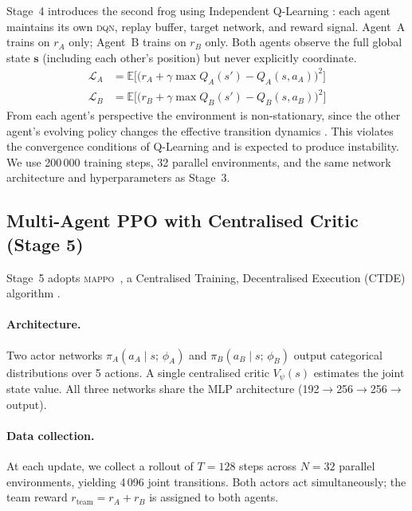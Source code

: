 \documentclass[12pt]{article}
\newcommand{\state}{s}
\newcommand{\action}{a}
\newcommand{\policy}{\pi}
\newcommand{\discount}{\gamma}
\newcommand{\MAPPO}{\textsc{mappo}}
\newcommand{\DQN}{\textsc{dqn}}
\begin{document}
Stage~4 introduces the second frog using Independent Q-Learning
\citep{tan1993multi}: each agent maintains its own \DQN, replay buffer,
target network, and reward signal.  Agent~A trains on $r_A$ only; Agent~B
trains on $r_B$ only.  Both agents observe the full global state
$\mathbf{s}$ (including each other's position) but never explicitly coordinate.
\begin{align}
  \mathcal{L}_A &= \mathbb{E}\bigl[\bigl(r_A + \discount \max Q_A(\state')
    - Q_A(\state, \action_A)\bigr)^2\bigr] \label{eq:idqn_a} \\
  \mathcal{L}_B &= \mathbb{E}\bigl[\bigl(r_B + \discount \max Q_B(\state')
    - Q_B(\state, \action_B)\bigr)^2\bigr] \label{eq:idqn_b}
\end{align}
From each agent's perspective the environment is non-stationary, since the
other agent's evolving policy changes the effective transition dynamics
\citep{hernandez2017survey}.  This violates the convergence conditions of
Q-Learning and is expected to produce instability.  We use 200\,000 training
steps, 32 parallel environments, and the same network architecture and
hyperparameters as Stage~3.

\subsection{Multi-Agent PPO with Centralised Critic (Stage 5)}
\label{sec:mappo}

Stage~5 adopts \MAPPO~\citep{yu2022surprising}, a Centralised Training,
Decentralised Execution (CTDE) algorithm \citep{oliehoek2016concise}.

\paragraph{Architecture.}
Two actor networks $\policy_A(\action_A \mid \state;\, \phi_A)$ and
$\policy_B(\action_B \mid \state;\, \phi_B)$ output categorical distributions
over 5 actions.  A single centralised critic
$V_\psi(\state)$ estimates the joint state value.  All three networks share
the MLP architecture (192$\to$256$\to$256$\to$output).

\paragraph{Data collection.}
At each update, we collect a rollout of $T = 128$ steps across $N = 32$
parallel environments, yielding 4\,096 joint transitions.  Both actors act
simultaneously; the team reward $r_{\text{team}} = r_A + r_B$ is assigned to
both agents.
\end{document}
